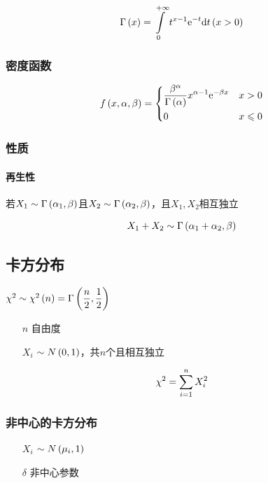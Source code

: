 \documentclass{article}
\begin{document}
\[\Gamma\left(x\right)=\int\limits_0^{+\infty}t^{x-1}\mathrm e^{-t}\mathrm d t\left(x>0\right)\]

\subsubsection{密度函数}

\[f\left(x,\alpha,\beta\right)=
    \left\{\begin{aligned}
         & \frac{\beta^\alpha}{\Gamma\left(\alpha\right)}x^{\alpha-1}\mathrm e^{-\beta x} &  & x>0         \\
         & 0                                                              &  & x\leqslant0
    \end{aligned}\right.\]

\subsubsection{性质}

\paragraph{再生性}

若$X_1\sim\Gamma\left(\alpha_1,\beta\right)$且$X_2\sim\Gamma\left(\alpha_2,\beta\right)$，且$X_1,X_2$相互独立

\[X_1+X_2\sim\Gamma\left(\alpha_1+\alpha_2,\beta\right)\]

\subsection{卡方分布}

$\chi^2\sim\chi^2\left(n\right)=\Gamma\left(\dfrac n2,\dfrac12\right)$

\begin{enumerate}
    \item [$n$] 自由度
    \item [$X_i$] $\sim N\left(0,1\right)$，共$n$个且相互独立
\end{enumerate}

\[\chi^2=\sum\limits_{i=1}^n X_i^2\]

\subsubsection{非中心的卡方分布}

\begin{enumerate}
    \item [$X_i$] $\sim N\left(\mu_i,1\right)$
    \item [$\delta$] 非中心参数
\end{enumerate}
\end{document}
